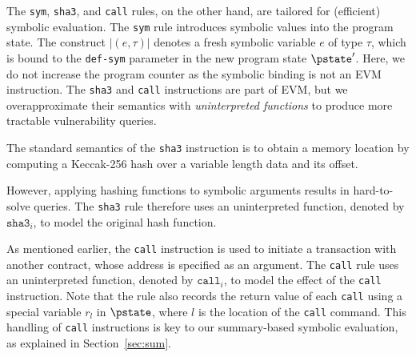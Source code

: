 The  \texttt{sym},  \texttt{sha3}, and  \texttt{call} rules, on the other hand, are 
tailored for (efficient) symbolic evaluation. 
The \texttt{sym} rule introduces symbolic values into the program state. 
The construct $|(e,\tau)|$ denotes a fresh symbolic variable $e$ of type $\tau$,
which is bound to the \texttt{def-sym} parameter in the new program state
$\pstate'$. Here, we do not increase the program counter as the symbolic binding
is not an EVM instruction.
The \texttt{sha3} and \texttt{call} instructions are part of EVM, but we overapproximate their 
semantics with  \emph{uninterpreted functions} to produce more tractable vulnerability queries. 

The standard semantics of the \texttt{sha3} instruction is to obtain a memory 
location by computing a Keccak-256 hash over a variable length data and its offset.

However, applying hashing functions to symbolic arguments results in hard-to-solve queries. 
The \texttt{sha3} rule therefore uses an uninterpreted function, denoted by $\texttt{sha3}_i$,  
to model the original hash function. 

As mentioned earlier, the \texttt{call} instruction is used to initiate 
a transaction with another contract, whose address is specified as an argument.
The \texttt{call} rule uses an 
uninterpreted function, denoted by $\texttt{call}_i$, to model the effect of the \texttt{call} instruction. 
Note that the rule also records the return value of each \texttt{call} using a special variable 
$r_l$ in $\pstate$, where $l$ is the location of the \texttt{call} command. 
This handling of \texttt{call} instructions is key to our summary-based symbolic evaluation, as explained 
in Section~\ref{sec:sum}.
